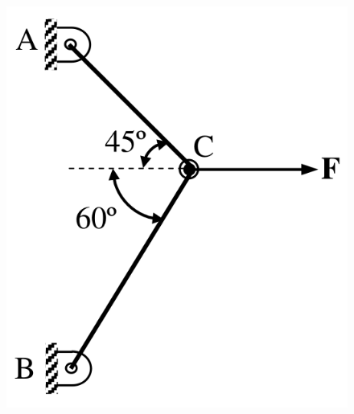 \documentclass[journal,11pt,onecolumn]{IEEEtran}
\begin{document}
\begin{figure}[H]
    \centering
    \includegraphics[scale=0.2]{q48}
    \caption{}
    \label{q48}
\end{figure}
\end{document}
